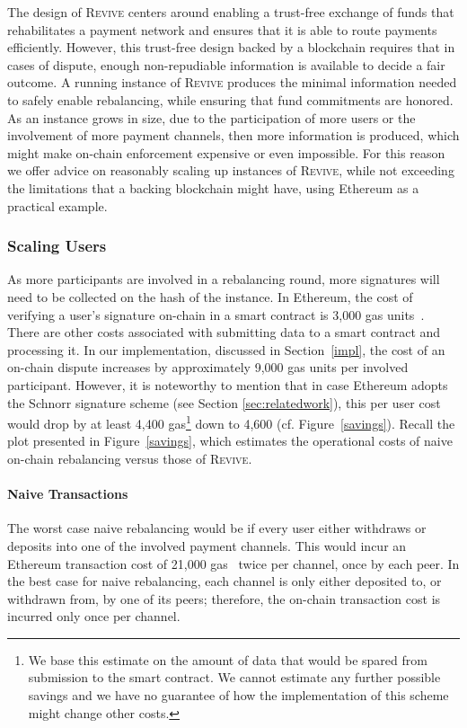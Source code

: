 \documentclass[sigconf]{acmart}
\newcommand{\name}{\textsc{Revive}\xspace}
\begin{document}
The design of \name centers around enabling a trust-free exchange of funds that rehabilitates a payment network and ensures that it is able to route payments efficiently. However, this trust-free design backed by a blockchain requires that in cases of dispute, enough non-repudiable information is available to decide a fair outcome.
A running instance of \name produces the minimal information needed to safely enable rebalancing, while ensuring that fund commitments are honored. As an instance grows in size, due to the participation of more users or the involvement of more payment channels, then more information is produced, which might make on-chain enforcement expensive or even impossible.
For this reason we offer advice on reasonably scaling up instances of \name, while not exceeding the limitations that a backing blockchain might have, using Ethereum as a practical example.

\subsubsection{Scaling Users}
\label{sec:usability:scale}
As more participants are involved in a rebalancing round, more signatures will need to be collected on the hash of the instance.
In Ethereum, the cost of verifying a user's signature on-chain in a smart contract is 3,000 gas units~\cite{buterin2014ethereum}. There are other costs associated with submitting data to a smart contract and processing it. In our implementation, discussed in Section~\ref{impl}, the cost of an on-chain dispute increases by approximately 9,000 gas units per involved participant. However, it is noteworthy to mention that in case Ethereum adopts the Schnorr \cite{Schnorr:1991:ESG:2724954.2725006} signature scheme (see Section \ref{sec:relatedwork}), this per user cost would drop by at least 4,400 gas\footnote{We base this estimate on the amount of data that would be spared from submission to the smart contract. We cannot estimate any further possible savings and we have no guarantee of how the implementation of this scheme might change other costs. } down to 4,600 (cf. Figure~\ref{savings}).
Recall the plot presented in Figure~\ref{savings}, which estimates the operational costs of naive on-chain rebalancing versus those of \name. 

\paragraph{Naive Transactions}
The worst case naive rebalancing would be if every user either withdraws or deposits into one of the involved payment channels. This would incur an Ethereum transaction cost of 21,000 gas~\cite{buterin2014ethereum} twice per channel, once by each peer. In the best case for naive rebalancing, each channel is only either deposited to, or withdrawn from, by one of its peers; therefore, the on-chain transaction cost is incurred only once per channel.
\end{document}
